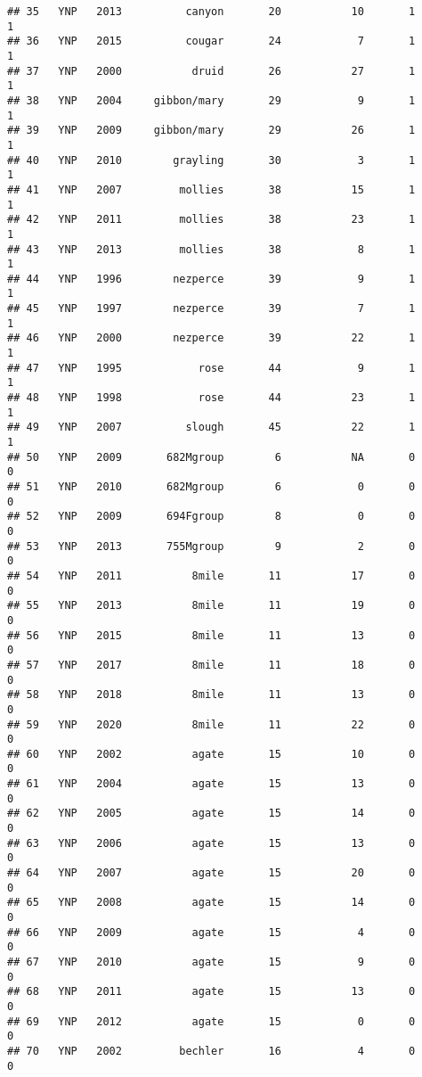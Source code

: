 \documentclass[
]{article}
\begin{document}
\begin{verbatim}
## 35   YNP   2013          canyon       20           10       1        1
## 36   YNP   2015          cougar       24            7       1        1
## 37   YNP   2000           druid       26           27       1        1
## 38   YNP   2004     gibbon/mary       29            9       1        1
## 39   YNP   2009     gibbon/mary       29           26       1        1
## 40   YNP   2010        grayling       30            3       1        1
## 41   YNP   2007         mollies       38           15       1        1
## 42   YNP   2011         mollies       38           23       1        1
## 43   YNP   2013         mollies       38            8       1        1
## 44   YNP   1996        nezperce       39            9       1        1
## 45   YNP   1997        nezperce       39            7       1        1
## 46   YNP   2000        nezperce       39           22       1        1
## 47   YNP   1995            rose       44            9       1        1
## 48   YNP   1998            rose       44           23       1        1
## 49   YNP   2007          slough       45           22       1        1
## 50   YNP   2009       682Mgroup        6           NA       0        0
## 51   YNP   2010       682Mgroup        6            0       0        0
## 52   YNP   2009       694Fgroup        8            0       0        0
## 53   YNP   2013       755Mgroup        9            2       0        0
## 54   YNP   2011           8mile       11           17       0        0
## 55   YNP   2013           8mile       11           19       0        0
## 56   YNP   2015           8mile       11           13       0        0
## 57   YNP   2017           8mile       11           18       0        0
## 58   YNP   2018           8mile       11           13       0        0
## 59   YNP   2020           8mile       11           22       0        0
## 60   YNP   2002           agate       15           10       0        0
## 61   YNP   2004           agate       15           13       0        0
## 62   YNP   2005           agate       15           14       0        0
## 63   YNP   2006           agate       15           13       0        0
## 64   YNP   2007           agate       15           20       0        0
## 65   YNP   2008           agate       15           14       0        0
## 66   YNP   2009           agate       15            4       0        0
## 67   YNP   2010           agate       15            9       0        0
## 68   YNP   2011           agate       15           13       0        0
## 69   YNP   2012           agate       15            0       0        0
## 70   YNP   2002         bechler       16            4       0        0

\end{verbatim}
\end{document}
